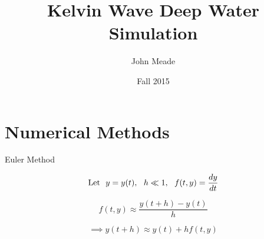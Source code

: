 \documentclass{beamer}
\title[Kelvin Wave Deep Water Simulation]{Kelvin Wave Deep Water Simulation}
\author{John Meade}
\date{Fall 2015}
\begin{document}
\begin{frame}
  \titlepage
\end{frame}


\section{Numerical Methods} %

\begin{frame}{Euler Method}

\vspace{0.3\textheight}

$$\textnormal{Let} \:\:\: y = y(t), \:\:\: h \ll 1, \:\:\: f(t,y) = \frac{dy}{dt}$$


$$f(t,y) \approx \frac{y(t+h) - y(t)}{h}$$

$$\implies y(t+h) \approx y(t) + hf(t,y)$$



\end{frame}
\end{document}
